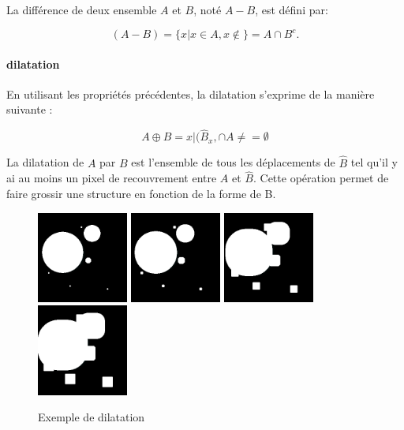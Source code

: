La différence de deux ensemble $A$ et $B$, noté $A - B$, est défini par:

\begin{equation}
  (A-B) = \{x|x \in A, x\not\in \} = A \cap B^c.  
\end{equation}


\paragraph{dilatation}
En utilisant les propriétés précédentes, la dilatation s'exprime de la manière suivante :

\begin{equation}
 A \oplus B = {x|(\widehat{B}_x, \cap A \neq = \emptyset }
\end{equation}

La dilatation de $A$ par $B$ est l'ensemble de tous les déplacements de $\widehat{B}$ tel qu'il y ai au moins un pixel de recouvrement entre $A$ et $\widehat{B}$. Cette opération permet de faire grossir une structure en fonction de la forme de B.

\begin{figure}
  \centering
  \includegraphics[height=3cm]{Images/morpho_init.png}
  \includegraphics[height=3cm]{Images/morpho_dilate_k5.png}
  \includegraphics[height=3cm]{Images/morpho_dilate_k21.png}
  \includegraphics[height=3cm]{Images/morpho_dilate_k31.png}
  \label{fig:morpho_dilation}
  \caption{Exemple de dilatation}
\end{figure}


